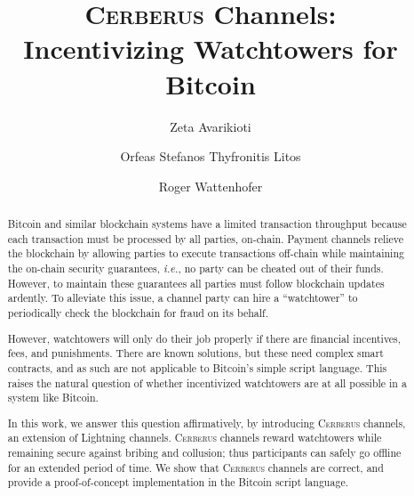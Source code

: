 \documentclass[runningheads]{llncs}
\newcommand{\ie}{{\em i.e.}}
\newcommand{\sys}{\textsc{Cerberus}\xspace}
\begin{document}
\title{\sys Channels: \\ Incentivizing Watchtowers for Bitcoin}
\titlerunning{\sys channels}
%
\author{Zeta Avarikioti \and
Orfeas Stefanos Thyfronitis Litos \and Roger Wattenhofer}
%
%
%

\date{}
\maketitle


%
%
\begin{abstract}
Bitcoin and similar blockchain systems have a limited transaction throughput because each transaction must be processed by all parties, on-chain. 
Payment channels relieve the blockchain by allowing parties to execute transactions off-chain while maintaining the on-chain security guarantees, \ie, no party can be cheated out of their funds. However, to maintain these guarantees all parties must follow blockchain updates ardently.
To alleviate this issue, a channel party can hire a ``watchtower'' to periodically check the blockchain for fraud on its behalf.

However, watchtowers will only do their job properly if there are financial incentives, fees, and punishments. There are known solutions, but these need complex smart contracts, and as such are not applicable to Bitcoin's simple script language. This raises the natural question of whether incentivized watchtowers are at all possible in a system like Bitcoin.

In this work, we answer this question affirmatively, by introducing \sys channels, an extension of Lightning channels. \sys channels reward watchtowers while remaining secure against bribing and collusion; thus participants can safely go offline for an extended period of time. 
We show that \sys channels are correct, and provide a proof-of-concept implementation in the Bitcoin script language.

\end{abstract}
\end{document}
